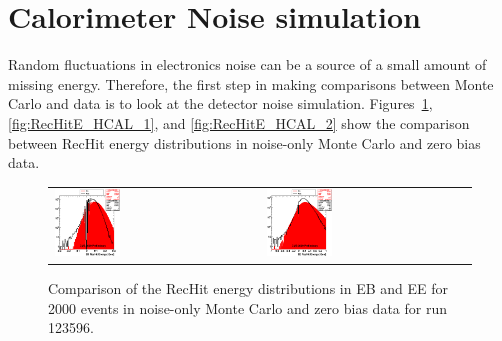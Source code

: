 \section{Calorimeter Noise simulation}
\label{sc:CaloNoise}

Random fluctuations in electronics noise can be a source of a small amount of missing energy. Therefore, the first step
in making comparisons between Monte Carlo and data is to look at the detector noise simulation. Figures~\ref{fig:RecHitE_ECAL},
\ref{fig:RecHitE_HCAL_1}, and \ref{fig:RecHitE_HCAL_2} show the comparison between RecHit energy distributions in noise-only
Monte Carlo and zero bias data.

\begin{figure}[h!]
 \centering
 \begin{tabular}{ll}
  \includegraphics[width=0.33\textwidth]{plots_CaloNoise/h_RecHitEinEB.eps} &
  \includegraphics[width=0.33\textwidth]{plots_CaloNoise/h_RecHitEinEE.eps} \\
 \end{tabular}
 \caption{\small Comparison of the RecHit energy distributions in EB and EE for 2000 events in noise-only Monte Carlo
          and zero bias data for run 123596.\label{fig:RecHitE_ECAL}}
\end{figure}

